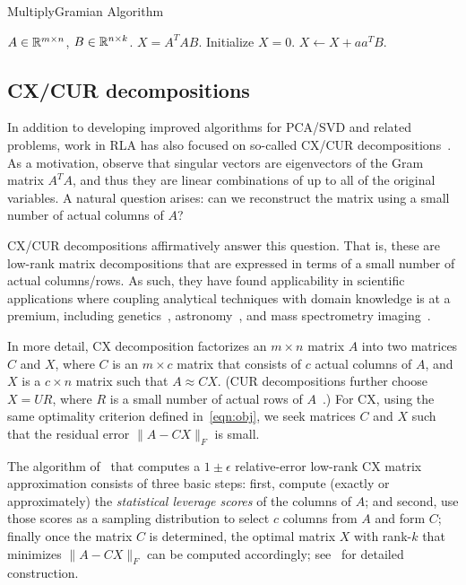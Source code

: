 \begin{algorithm}[tb]
  \caption{{\sc MultiplyGramian} Algorithm}
  \label{alg:gram}
  \begin{algorithmic}[1]
    \Require $A \in \mathbb{R}^{m\times n}$, $B \in \mathbb{R}^{n\times k}$.
    \Ensure $X = A^T A B$.
    \State Initialize $X = 0$.
        \State $X \gets X + a a^T B$.
    \EndFor
  \end{algorithmic}
\end{algorithm}


\subsection{CX/CUR decompositions}

In addition to developing improved algorithms for PCA/SVD and related problems,
work in RLA has also focused on so-called CX/CUR
decompositions~\cite{DMM08,CUR_PNAS}.  As a motivation, observe that singular
vectors are eigenvectors of the Gram matrix $A^TA$, and thus they are linear
combinations of up to all of the original variables.  A natural question
arises: can we reconstruct the matrix using a small number of actual columns of
$A$?

CX/CUR decompositions affirmatively answer this question.  That is, these are
low-rank matrix decompositions that are expressed in terms of a small number of
actual columns/rows. As such, they have found applicability in scientific
applications where coupling analytical techniques with domain knowledge is at a
premium, including genetics~\cite{Paschou07b}, astronomy~\cite{Yip14-AJ}, and
mass spectrometry imaging~\cite{YRPMB15}.

In more detail, CX decomposition factorizes an $m \times n$ matrix $A$ into two
matrices $C$ and $X$, where $C$ is an $m\times c$ matrix that consists of $c$
actual columns of $A$, and $X$ is a $c \times n$ matrix such that $A\approx
CX$.
(CUR decompositions further choose $X=UR$, where $R$ is a small number of actual rows
of $A$~\cite{DMM08,CUR_PNAS}.)
For CX, using the same optimality criterion defined in~\eqref{eqn:obj}, we seek
matrices $C$ and $X$ such that the residual error $\|A-CX\|_F$ is small.

The algorithm of~\cite{DMM08} that computes a $1\pm\epsilon$ relative-error
low-rank CX matrix approximation consists of three basic steps: first, compute
(exactly or approximately) the {\it statistical leverage scores} of the columns
of $A$; and second, use those scores as a sampling distribution to select $c$
columns from $A$ and form $C$; finally once the matrix $C$ is determined, the
optimal matrix $X$ with rank-$k$ that minimizes $\|A-CX\|_F$ can be computed
accordingly; see~\cite{DMM08} for detailed construction. 

